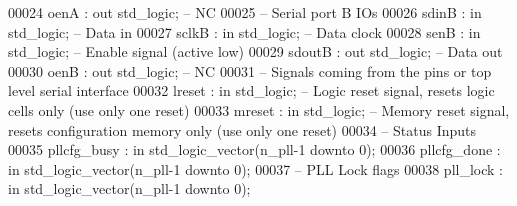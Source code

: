 \begin{DoxyCode}
00024         \textcolor{vhdlchar}{oenA}            \textcolor{vhdlchar}{:} \textcolor{keywordflow}{out} \textcolor{comment}{std\_logic};\textcolor{keyword}{  -- NC     }
00025 \textcolor{keyword}{            -- Serial port B IOs}
00026         \textcolor{vhdlchar}{sdinB}           \textcolor{vhdlchar}{:} \textcolor{keywordflow}{in} \textcolor{comment}{std\_logic};\textcolor{keyword}{     -- Data in}
00027         \textcolor{vhdlchar}{sclkB}           \textcolor{vhdlchar}{:} \textcolor{keywordflow}{in} \textcolor{comment}{std\_logic};\textcolor{keyword}{     -- Data clock}
00028         \textcolor{vhdlchar}{senB}            \textcolor{vhdlchar}{:} \textcolor{keywordflow}{in} \textcolor{comment}{std\_logic};\textcolor{keyword}{ -- Enable signal (active low)}
00029         \textcolor{vhdlchar}{sdoutB}      \textcolor{vhdlchar}{:} \textcolor{keywordflow}{out} \textcolor{comment}{std\_logic};\textcolor{keyword}{    -- Data out}
00030         \textcolor{vhdlchar}{oenB}            \textcolor{vhdlchar}{:} \textcolor{keywordflow}{out} \textcolor{comment}{std\_logic};\textcolor{keyword}{  -- NC     }
00031 \textcolor{keyword}{            -- Signals coming from the pins or top level serial interface}
00032         \textcolor{vhdlchar}{lreset}      \textcolor{vhdlchar}{:} \textcolor{keywordflow}{in} \textcolor{comment}{std\_logic};\textcolor{keyword}{     -- Logic reset signal, resets logic cells only  (use only one
       reset)}
00033         \textcolor{vhdlchar}{mreset}      \textcolor{vhdlchar}{:} \textcolor{keywordflow}{in} \textcolor{comment}{std\_logic};\textcolor{keyword}{     -- Memory reset signal, resets configuration memory only (use only
       one reset)}
00034 \textcolor{keyword}{            -- Status Inputs}
00035         \textcolor{vhdlchar}{pllcfg_busy} \textcolor{vhdlchar}{:} \textcolor{keywordflow}{in} \textcolor{comment}{std\_logic\_vector}\textcolor{vhdlchar}{(}\textcolor{vhdlchar}{n_pll}\textcolor{vhdlchar}{-}\textcolor{vhdllogic}{}\textcolor{vhdllogic}{1} \textcolor{keywordflow}{downto} \textcolor{vhdllogic}{}\textcolor{vhdllogic}{0}\textcolor{vhdlchar}{)};
00036         \textcolor{vhdlchar}{pllcfg_done} \textcolor{vhdlchar}{:} \textcolor{keywordflow}{in} \textcolor{comment}{std\_logic\_vector}\textcolor{vhdlchar}{(}\textcolor{vhdlchar}{n_pll}\textcolor{vhdlchar}{-}\textcolor{vhdllogic}{}\textcolor{vhdllogic}{1} \textcolor{keywordflow}{downto} \textcolor{vhdllogic}{}\textcolor{vhdllogic}{0}\textcolor{vhdlchar}{)};    
00037 \textcolor{keyword}{            -- PLL Lock flags}
00038         \textcolor{vhdlchar}{pll_lock}        \textcolor{vhdlchar}{:} \textcolor{keywordflow}{in} \textcolor{comment}{std\_logic\_vector}\textcolor{vhdlchar}{(}\textcolor{vhdlchar}{n_pll}\textcolor{vhdlchar}{-}\textcolor{vhdllogic}{}\textcolor{vhdllogic}{1} \textcolor{keywordflow}{downto} \textcolor{vhdllogic}{}\textcolor{vhdllogic}{0}\textcolor{vhdlchar}{)};    

\end{DoxyCode}
